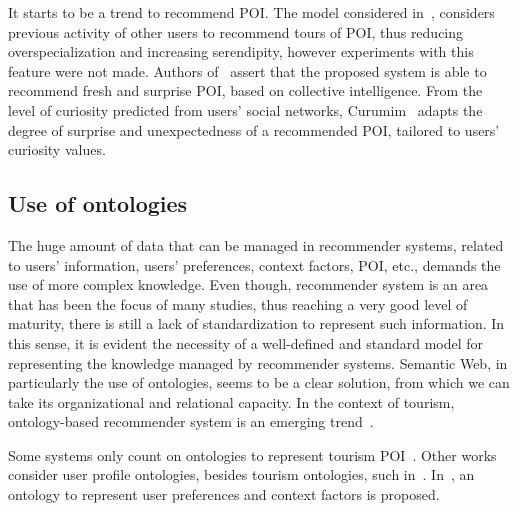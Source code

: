 
It starts to be a trend to recommend  POI. The model considered in~\cite{rajaonarivo2019rec}, considers previous activity of other users to recommend tours of POI, thus reducing overspecialization and increasing serendipity, however experiments with this feature were not made. Authors of~\cite{shen2016attraction} assert that the proposed system is able to recommend fresh and surprise POI, based on collective intelligence.
 From the level of curiosity predicted from users' social networks, Curumim~\cite{menk2017curumim}  adapts the degree of surprise and unexpectedness of a recommended POI, tailored to users' curiosity values. 






\vspace{-0.2cm}
\subsection{Use of ontologies}

The huge amount of data that can be managed in recommender systems, related to users' information, users' preferences, context factors, POI, etc.,   demands the use of more complex knowledge. Even though, recommender system is an area that has been the focus of many studies, thus reaching a very good level of maturity, there is still a lack of standardization to represent such information. In this sense, it is evident the necessity of a well-defined and standard model for representing the knowledge managed by recommender systems. Semantic Web, in particularly the use of ontologies, seems to be a clear solution, from which we can take its organizational and relational capacity.
In the context of tourism, ontology-based  recommender  system  is  an  emerging  trend~\cite{borras2014intelligent,yochum2020linked}.

Some systems only count on ontologies to represent tourism  POI~\cite{rajaonarivo2019rec,bahramian_abbaspour_claramunt_2017,garcia2009speta,arigi2018context}. Other works consider user profile ontologies, besides tourism ontologies, such in~\cite{ruotsalo2013smartmuseum}. In~\cite{alonso2012ontology}, an ontology to represent user preferences and context factors is proposed.



